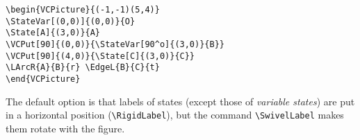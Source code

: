 \documentclass[11pt,twoside]{article}
\newlength{\parindenttemp} %
\newcommand{\noi}{\noindent}
\newlength{\jsIndent}%
\newlength{\ColSource}%
\newlength{\ColFigur}%
\begin{document}
\medskip
\noi 
\hspace*{-\jsIndent}
\begin{minipage}[c]{\ColFigur}%
\par\vspace*{0mm}%
\begin{center}
\SmallPicture{}
\end{center}
\end{minipage}%
\hspace*{1.2em}%
\begin{minipage}[c]{\ColSource}
\setlength{\parindent}{\parindenttemp}%
\par\vspace*{0mm}%
\footnotesize
\begin{verbatim}
\begin{VCPicture}{(-1,-1)(5,4)}
\StateVar[(0,0)]{(0,0)}{O}
\State[A]{(3,0)}{A}
\VCPut[90]{(0,0)}{\StateVar[90^o]{(3,0)}{B}}
\VCPut[90]{(4,0)}{\State[C]{(3,0)}{C}}
\LArcR{A}{B}{r} \EdgeL{B}{C}{t}
\end{VCPicture}
\end{verbatim}
\normalsize
\end{minipage}%

The default option is that labels of states (except those of \emph{variable states}) are put in a horizontal
position (\verb+\RigidLabel+), but the command \verb+\SwivelLabel+
makes them rotate with the figure.
\end{document}
